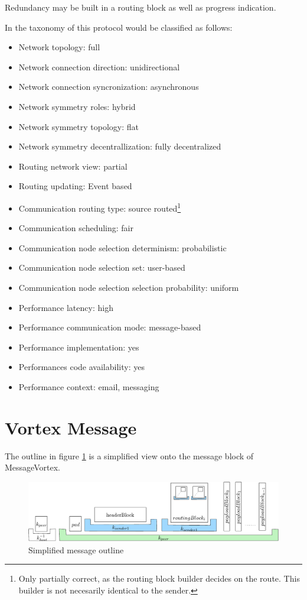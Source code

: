 Redundancy may be built in a routing block as well as progress indication.

In the taxonomy of \cite{Shirazi2018} this protocol would be classified as follows:

\begin{itemize}
	\item Network topology: full
	\item Network connection direction: unidirectional
	\item Network connection syncronization: asynchronous
	\item Network symmetry roles: hybrid
	\item Network symmetry topology: flat
	\item Network symmetry decentrallization: fully decentralized
	\item Routing network view: partial
	\item Routing updating: Event based
	\item Communication routing type: source routed\footnote{Only partially correct, as the routing block builder decides on the route. This builder is not necesarily identical to the sender.}
	\item Communication scheduling: fair
	\item Communication node selection determinism: probabilistic
	\item Communication node selection set: user-based
	\item Communication node selection selection probability: uniform
	\item Performance latency: high
	\item Performance communication mode: message-based
	\item Performance implementation: yes
	\item Performances code availability: yes
	\item Performance context: email, messaging
\end{itemize}

\section{Vortex Message}
The outline in figure \ref{fig:messageOutline} is a simplified view onto the message block of MessageVortex.

\begin{figure}[ht]
	\includegraphics[width=\textwidth]{inc/blockLayoutSimplified}
	\caption{Simplified message outline}
    \label{fig:messageOutline}
\end{figure}

